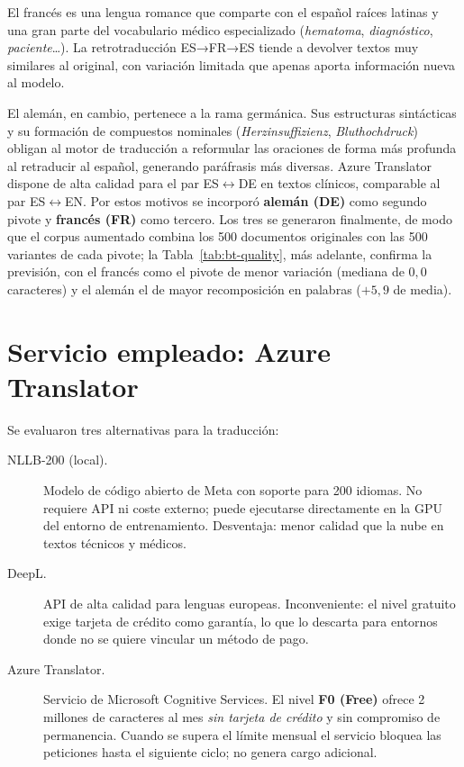 El francés es una lengua romance que comparte con el español raíces latinas y una gran parte del vocabulario médico especializado (\emph{hematoma}, \emph{diagnóstico}, \emph{paciente}…). La retrotraducción ES→FR→ES tiende a devolver textos muy similares al original, con variación limitada que apenas aporta información nueva al modelo.

El alemán, en cambio, pertenece a la rama germánica. Sus estructuras sintácticas y su formación de compuestos nominales (\emph{Herzinsuffizienz}, \emph{Bluthochdruck}) obligan al motor de traducción a reformular las oraciones de forma más profunda al retraducir al español, generando paráfrasis más diversas. Azure Translator dispone de alta calidad para el par ES$\leftrightarrow$DE en textos clínicos, comparable al par ES$\leftrightarrow$EN. Por estos motivos se incorporó \textbf{alemán (DE)} como segundo pivote y \textbf{francés (FR)} como tercero. Los tres se generaron finalmente, de modo que el corpus aumentado combina los 500 documentos originales con las 500 variantes de cada pivote; la Tabla~\ref{tab:bt-quality}, más adelante, confirma la previsión, con el francés como el pivote de menor variación (mediana de $0{,}0$ caracteres) y el alemán el de mayor recomposición en palabras ($+5{,}9$ de media).

\section{Servicio empleado: Azure Translator}

Se evaluaron tres alternativas para la traducción:

\begin{description}
  \item[NLLB-200 (local).] Modelo de código abierto de Meta con soporte para 200 idiomas. No requiere API ni coste externo; puede ejecutarse directamente en la GPU del entorno de entrenamiento. Desventaja: menor calidad que la nube en textos técnicos y médicos.
  \item[DeepL.] API de alta calidad para lenguas europeas. Inconveniente: el nivel gratuito exige tarjeta de crédito como garantía, lo que lo descarta para entornos donde no se quiere vincular un método de pago.
  \item[Azure Translator.] Servicio de Microsoft Cognitive Services. El nivel \textbf{F0 (Free)} ofrece 2 millones de caracteres al mes \emph{sin tarjeta de crédito} y sin compromiso de permanencia. Cuando se supera el límite mensual el servicio bloquea las peticiones hasta el siguiente ciclo; no genera cargo adicional.
\end{description}

